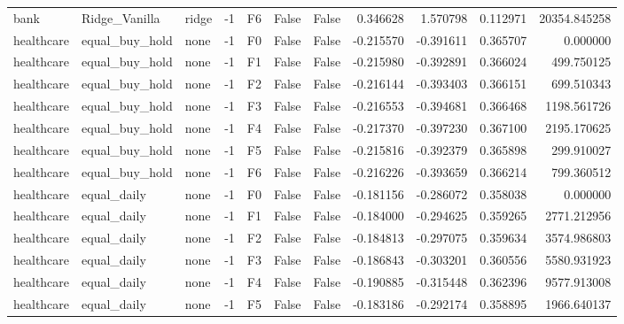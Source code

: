 \begin{tabular}{lllrlllrrrr}
      bank &  Ridge\_Vanilla &     ridge &    -1 &  F6 &           False &            False &  0.346628 &  1.570798 & 0.112971 &     20354.845258 \\
healthcare & equal\_buy\_hold &      none &    -1 &  F0 &           False &            False & -0.215570 & -0.391611 & 0.365707 &         0.000000 \\
healthcare & equal\_buy\_hold &      none &    -1 &  F1 &           False &            False & -0.215980 & -0.392891 & 0.366024 &       499.750125 \\
healthcare & equal\_buy\_hold &      none &    -1 &  F2 &           False &            False & -0.216144 & -0.393403 & 0.366151 &       699.510343 \\
healthcare & equal\_buy\_hold &      none &    -1 &  F3 &           False &            False & -0.216553 & -0.394681 & 0.366468 &      1198.561726 \\
healthcare & equal\_buy\_hold &      none &    -1 &  F4 &           False &            False & -0.217370 & -0.397230 & 0.367100 &      2195.170625 \\
healthcare & equal\_buy\_hold &      none &    -1 &  F5 &           False &            False & -0.215816 & -0.392379 & 0.365898 &       299.910027 \\
healthcare & equal\_buy\_hold &      none &    -1 &  F6 &           False &            False & -0.216226 & -0.393659 & 0.366214 &       799.360512 \\
healthcare &    equal\_daily &      none &    -1 &  F0 &           False &            False & -0.181156 & -0.286072 & 0.358038 &         0.000000 \\
healthcare &    equal\_daily &      none &    -1 &  F1 &           False &            False & -0.184000 & -0.294625 & 0.359265 &      2771.212956 \\
healthcare &    equal\_daily &      none &    -1 &  F2 &           False &            False & -0.184813 & -0.297075 & 0.359634 &      3574.986803 \\
healthcare &    equal\_daily &      none &    -1 &  F3 &           False &            False & -0.186843 & -0.303201 & 0.360556 &      5580.931923 \\
healthcare &    equal\_daily &      none &    -1 &  F4 &           False &            False & -0.190885 & -0.315448 & 0.362396 &      9577.913008 \\
healthcare &    equal\_daily &      none &    -1 &  F5 &           False &            False & -0.183186 & -0.292174 & 0.358895 &      1966.640137 \\

\end{tabular}
